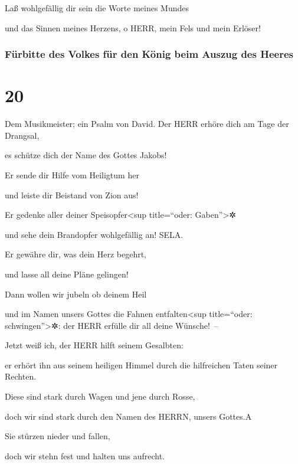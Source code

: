 Laß wohlgefällig dir sein die Worte meines Mundes

und das Sinnen meines Herzens, o HERR, mein Fels und mein Erlöser!

\hypertarget{fuxfcrbitte-des-volkes-fuxfcr-den-kuxf6nig-beim-auszug-des-heeres}{%
\subsubsection{Fürbitte des Volkes für den König beim Auszug des
Heeres}\label{fuxfcrbitte-des-volkes-fuxfcr-den-kuxf6nig-beim-auszug-des-heeres}}

\hypertarget{section-19}{%
\section{20}\label{section-19}}

Dem Musikmeister; ein Psalm von David. Der
HERR erhöre dich am Tage der Drangsal,

es schütze dich der Name des Gottes Jakobs!

Er sende dir Hilfe vom Heiligtum her

und leiste dir Beistand von Zion aus!

Er gedenke aller deiner Speisopfer\textless sup
title=``oder: Gaben''\textgreater✲

und sehe dein Brandopfer wohlgefällig an! SELA.

Er gewähre dir, was dein Herz begehrt,

und lasse all deine Pläne gelingen!

Dann wollen wir jubeln ob deinem Heil

und im Namen unsers Gottes die Fahnen entfalten\textless sup
title=``oder: schwingen''\textgreater✲: der HERR erfülle dir all deine
Wünsche!~--

Jetzt weiß ich, der HERR hilft seinem Gesalbten:

er erhört ihn aus seinem heiligen Himmel durch die hilfreichen Taten
seiner Rechten.

Diese sind stark durch Wagen und jene durch Rosse,

doch wir sind stark durch den Namen des HERRN, unsers Gottes.{A}

Sie stürzen nieder und fallen,

doch wir stehn fest und halten uns aufrecht.

